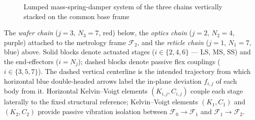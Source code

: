 \documentclass[11pt]{article}
\theoremstyle{definition}
\begin{document}
\begin{figure}[htbp]
\caption{Lumped mass-spring-damper system of the three chains vertically stacked on the common base frame}
\label{fig:litho_model_full}
\end{figure}

The \emph{wafer chain} ($j=3$, $N_3=7$,
red) below, the \emph{optics chain} ($j=2$, $N_2=4$, purple) attached to
the metrology frame $\mathcal{F}_2$, and the \emph{reticle chain} ($j=1$,
$N_1=7$, blue) above. Solid blocks denote actuated stages
($i\in\{2,4,6\}$ — LS, MS, SS) and the end-effectors ($i=N_j$); dashed
blocks denote passive flex couplings ($i\in\{3,5,7\}$). The dashed
vertical centerline is the intended trajectory from which horizontal blue
double-headed arrows label the in-plane deviation $f_{i,j}$ of each body
from it. Horizontal Kelvin–Voigt elements $(K_{i,j},C_{i,j})$ couple
each stage laterally to the fixed structural reference; Kelvin–Voigt
elements $(K_1,C_1)$ and $(K_2,C_2)$ provide passive vibration isolation between
$\mathcal{F}_0\!\rightarrow\!\mathcal{F}_1$ and
$\mathcal{F}_1\!\rightarrow\!\mathcal{F}_2$.
\end{document}
